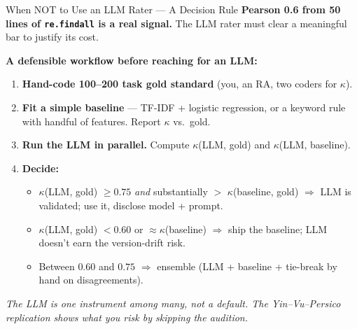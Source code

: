 \begin{frame}{When NOT to Use an LLM Rater --- A Decision Rule}
\textbf{Pearson 0.6 from 50 lines of \texttt{re.findall} is a real signal.} The LLM rater must clear a meaningful bar to justify its cost.

\medskip
\small
\textbf{A defensible workflow before reaching for an LLM:}
\begin{enumerate}\itemsep1pt
  \item \textbf{Hand-code 100--200 task gold standard} (you, an RA, two coders for $\kappa$).
  \item \textbf{Fit a simple baseline} --- TF-IDF + logistic regression, or a keyword rule with handful of features. Report $\kappa$ vs.\ gold.
  \item \textbf{Run the LLM in parallel.} Compute $\kappa$(LLM, gold) and $\kappa$(LLM, baseline).
  \item \textbf{Decide:}
  \begin{itemize}\itemsep0pt
    \item $\kappa$(LLM, gold) $\ge 0.75$ \emph{and} substantially $>$ $\kappa$(baseline, gold) $\Rightarrow$ LLM is validated; use it, disclose model + prompt.
    \item $\kappa$(LLM, gold) $< 0.60$ or $\approx \kappa$(baseline) $\Rightarrow$ ship the baseline; LLM doesn't earn the version-drift risk.
    \item Between $0.60$ and $0.75$ $\Rightarrow$ ensemble (LLM + baseline + tie-break by hand on disagreements).
  \end{itemize}
\end{enumerate}

\medskip
\textit{The LLM is one instrument among many, not a default. The Yin--Vu--Persico replication shows what you risk by skipping the audition.}
\end{frame}

